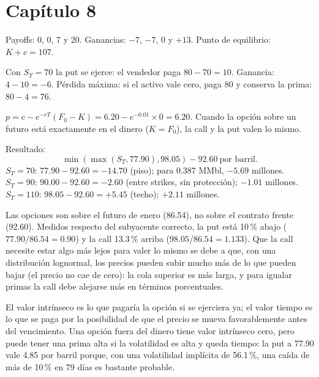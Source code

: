 \section*{Capítulo 8}

 Payoffs: 0, 0, 7 y 20. Ganancias: $-7$, $-7$, $0$ y $+13$. Punto de equilibrio: $K+c=107$.

 Con $S_T=70$ la put se ejerce: el vendedor paga $80-70=10$. Ganancia: $4-10=-6$. Pérdida máxima: si el activo vale cero, paga 80 y conserva la prima: $80-4=76$.

 $p=c-e^{-rT}(F_0-K)=6.20-e^{-0.01}\times0=6.20$. Cuando la opción sobre un futuro está exactamente en el dinero ($K=F_0$), la call y la put valen lo mismo.

 Resultado:
\[ \min(\max(S_T,77.90),98.05)-92.60\ \text{por barril}. \]
$S_T=70$: $77.90-92.60=-14.70$ (piso); para 0.387 MMbl, $-5.69$ millones.
$S_T=90$: $90.00-92.60=-2.60$ (entre strikes, sin protección); $-1.01$ millones.
$S_T=110$: $98.05-92.60=+5.45$ (techo); $+2.11$ millones.

 Las opciones son sobre el futuro de enero (86.54), no sobre el contrato frente (92.60). Medidos respecto del subyacente correcto, la put está 10\,\% abajo ($77.90/86.54=0.90$) y la call 13.3\,\% arriba ($98.05/86.54=1.133$). Que la call necesite estar algo más lejos para valer lo mismo se debe a que, con una distribución lognormal, los precios pueden subir mucho más de lo que pueden bajar (el precio no cae de cero): la cola superior es más larga, y para igualar primas la call debe alejarse más en términos porcentuales.

 El valor intrínseco es lo que pagaría la opción si se ejerciera ya; el valor tiempo es lo que se paga por la posibilidad de que el precio se mueva favorablemente antes del vencimiento. Una opción fuera del dinero tiene valor intrínseco cero, pero puede tener una prima alta si la volatilidad es alta y queda tiempo: la put a 77.90 vale 4.85 por barril porque, con una volatilidad implícita de 56.1\,\%, una caída de más de 10\,\% en 79 días es bastante probable.
